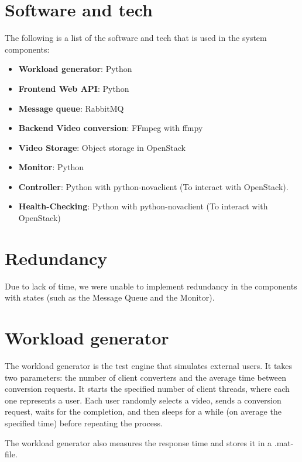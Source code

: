 \documentclass[a4paper, 10pt, english]{article}
\begin{document}
\section{Software and tech}
The following is a list of the software and tech that is used in the system components:
\begin{itemize}
	\item \textbf{Workload generator}: Python
	\item \textbf{Frontend Web API}: Python
	\item \textbf{Message queue}: RabbitMQ
	\item \textbf{Backend Video conversion}: FFmpeg with ffmpy
	\item \textbf{Video Storage}: Object storage in OpenStack
	\item \textbf{Monitor}: Python
	\item \textbf{Controller}: Python with python-novaclient (To interact with OpenStack).
	\item \textbf{Health-Checking}: Python with python-novaclient (To interact with OpenStack)
\end{itemize}

\section{Redundancy}
Due to lack of time, we were unable to implement redundancy in the components with states (such as the Message Queue and the Monitor).

\section{Workload generator} \label{sec:WG}
The workload generator is the test engine that simulates external users. It takes two parameters: the number of client converters and the average time between conversion requests. It starts the specified number of client threads, where each one represents a user. Each user randomly selects a video, sends a conversion request, waits for the completion, and then sleeps for a while (on average the specified time) before repeating the process.

The workload generator also measures the response time and stores it in a .mat-file.
\end{document}
